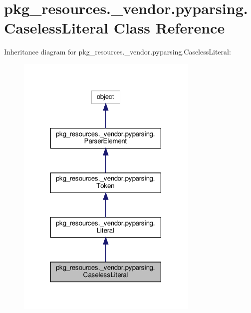 \hypertarget{classpkg__resources_1_1__vendor_1_1pyparsing_1_1CaselessLiteral}{}\section{pkg\+\_\+resources.\+\_\+vendor.\+pyparsing.\+Caseless\+Literal Class Reference}
\label{classpkg__resources_1_1__vendor_1_1pyparsing_1_1CaselessLiteral}


Inheritance diagram for pkg\+\_\+resources.\+\_\+vendor.\+pyparsing.\+Caseless\+Literal\+:
\nopagebreak
\begin{figure}[H]
\begin{center}
\leavevmode
\includegraphics[width=246pt]{classpkg__resources_1_1__vendor_1_1pyparsing_1_1CaselessLiteral__inherit__graph}
\end{center}
\end{figure}


